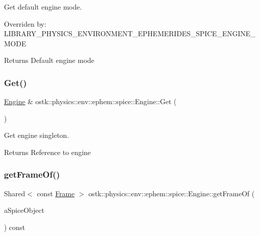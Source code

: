 Get default engine mode. 

Overriden by\+: L\+I\+B\+R\+A\+R\+Y\+\_\+\+P\+H\+Y\+S\+I\+C\+S\+\_\+\+E\+N\+V\+I\+R\+O\+N\+M\+E\+N\+T\+\_\+\+E\+P\+H\+E\+M\+E\+R\+I\+D\+E\+S\+\_\+\+S\+P\+I\+C\+E\+\_\+\+E\+N\+G\+I\+N\+E\+\_\+\+M\+O\+DE

\begin{DoxyReturn}{Returns}
Default engine mode 
\end{DoxyReturn}
\mbox{\label{classostk_1_1physics_1_1env_1_1ephem_1_1spice_1_1_engine_a98ce9249db18853920308c699fbca541}} 
\subsubsection{\texorpdfstring{Get()}{Get()}}
{\footnotesize\ttfamily \hyperlink{classostk_1_1physics_1_1env_1_1ephem_1_1spice_1_1_engine}{Engine} \& ostk\+::physics\+::env\+::ephem\+::spice\+::\+Engine\+::\+Get (\begin{DoxyParamCaption}{ }\end{DoxyParamCaption})\hspace{0.3cm}{\ttfamily [static]}}



Get engine singleton. 

\begin{DoxyReturn}{Returns}
Reference to engine 
\end{DoxyReturn}
\mbox{\label{classostk_1_1physics_1_1env_1_1ephem_1_1spice_1_1_engine_aeffd094033f2bd2c276b9d9a9840d7ea}} 
\subsubsection{\texorpdfstring{get\+Frame\+Of()}{getFrameOf()}}
{\footnotesize\ttfamily Shared$<$ const \hyperlink{classostk_1_1physics_1_1coord_1_1_frame}{Frame} $>$ ostk\+::physics\+::env\+::ephem\+::spice\+::\+Engine\+::get\+Frame\+Of (\begin{DoxyParamCaption}\item[{const \hyperlink{classostk_1_1physics_1_1env_1_1ephem_1_1_s_p_i_c_e_ae84db78d858cdd0a1dc3ff53090f4a1f}{S\+P\+I\+C\+E\+::\+Object} \&}]{a\+Spice\+Object }\end{DoxyParamCaption}) const}



